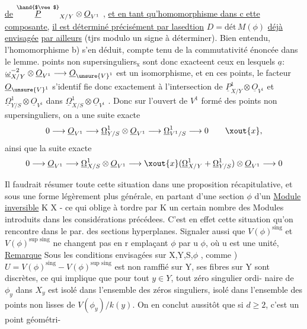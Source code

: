 
\uline{de} $\overset{\hand{$\vee$}}{\underline{P}}_{X/Y}\otimes\underline{O}_{V^1}$ , \uline{et en tant qu'homomorphisme dans c ette composante,}
\uline{il est déterminé précisément par lasedtion} $D = \text{dét}\,M(\phi)$ \uline{déjà envisagée}
\uline{par ailleurs} (tjrs modulo un signe à déterminer). Bien entendu,
l'homomorphisme b) s'en déduit, compte tenu de la commutativité énoncée
dans le lemme.  points non supersinguliers$_{\text{x}}$ sont donc exacteent
ceux en lesquels $\underline{a}$: $\underline{\omega}^{-2}_{X/Y}\otimes\underline{O}_{V^1}\longrightarrow\underline{O}_{\unsure{V}^1}$ est un isomorphisme, et en
ces points,  le facteur $\underline{O}_{\unsure{V}^1}$ s'identif
fie donc exactement à l'intersection de $\underline{P}^1_{X/Y}\otimes\underline{O}_{V^1}$ et $\underline{\Omega}^1_{Y/S}\otimes\underline{O}_{V^1}$
dans $\underline{\Omega}^1_{X/S}\otimes\underline{O}_{V^1}$ . Donc sur l'ouvert de $V^1$ formé des points non
supersinguliers, on a une suite exacte
\[ 0\longrightarrow\underline{O}_{V^1}\longrightarrow\underline{\Omega}^1_{Y/S}\otimes\underline{O}_{V^1}\longrightarrow\underline{\Omega}^1_{V^1/S}\longrightarrow 0 \qquad \xout{x}, \]
ainsi que la suite exacte
\[ 0\longrightarrow\underline{O}_{V^1}\longrightarrow\underline{\Omega}^1_{X/S}\otimes\underline{O}_{V^1}\longrightarrow\xout{x}(\underline{\Omega}^1_{X/Y}+\underline{\Omega}^1_{Y/S})\otimes\underline{O}_{V^1}\longrightarrow 0 \]

\margin{|} Il faudrait résumer  toute cette situation dans une proposition
récapitulative, et sous une forme légèrement plus générale, en partant
d'une section $\phi$ d'un \uline{Module inversible}  K  X - ce qui oblige
à tordre par K un certain nombre des Modules introduits dans les
considérations précédees. C'est en effet  cette situation qu'on
rencontre  dans le par. des sections hyperplanes. Signaler aussi que
\margin{|} $V(\phi)^{\text{sing}}$  et $V(\phi)^{\text{sup sing}}$ ne changent pas en r emplaçant $\phi$ par u $\phi$,
où u est une unité, 
\uline{Remarque} Sous les conditions envisagées sur X,Y,S,$\phi$ , comme )
$U = V(\phi)^{\text{sing}}- V(\phi)^{\text{sup sing}}$ est non ramffié sur Y, ses fibres sur Y sont
discrètes, ce qui implique que pour tout $y\in Y$, tout zéro singulier ordi-%
naire de $\phi_y$ dans $X_y$ est isolé dans l'ensemble des zéros singuliers, 
 isolé dans l'ensemble des points non lisses de $V(\phi_y)/k(y)$.
 On en conclut  aussitôt que si $d\geqslant 2$, c'est un point géométri-%

